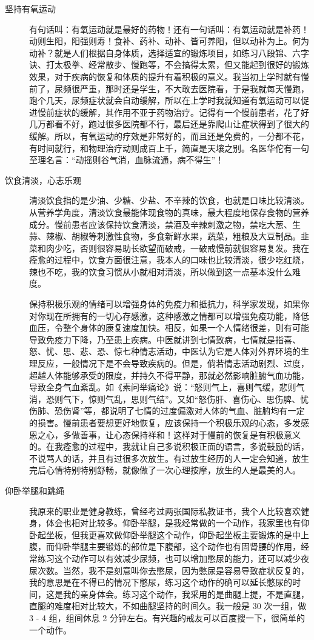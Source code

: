 \documentclass{ctexart}
\begin{document}
\begin{description}
    \item[坚持有氧运动] 有句话叫：有氧运动就是最好的药物！还有一句话叫：有氧运动就是补药！动则生阳，阳强则寿！食补、药补、动补、皆可养阳，但以动补为上。何为动补？就是人们根据自身体质，选择适宜的锻炼项目，如练习八段锦、六字诀、打太极拳、经常散步、慢跑等，不会搞得太累，但又能起到很好的锻炼效果，对于疾病的恢复和体质的提升有着积极的意义。我当初上学时就有慢前了，尿频很严重，那时还是学生，不大敢去医院看，于是我就每天慢跑，跑个几天，尿频症状就会自动缓解，所以在上学时我就知道有氧运动可以促进慢前症状的缓解，其作用不亚于药物治疗。记得有一个慢前患者，花了好几万都看不好，跑过很多医院都不行，最后还是靠爬山让症状得到了很大的缓解。所以，有氧运动的疗效是非常好的，而且还是免费的，一分都不花，有时间就行，和物理治疗动则成百上千，简直是天壤之别。名医华佗有一句至理名言：“动摇则谷气消，血脉流通，病不得生”！
    \item[饮食清淡，心志乐观] 清淡饮食指的是少油、少糖、少盐、不辛辣的饮食，也就是口味比较清淡。从营养学角度，清淡饮食最能体现食物的真味，最大程度地保存食物的营养成分。慢前患者应该保持饮食清淡，禁酒及辛辣刺激之物，禁吃大葱、生蒜、辣椒、胡椒等刺激性食物，多食新鲜水果，蔬菜，粗粮及大豆制品。韭菜和肉少吃，否则很容易助长欲望而破戒，一破戒慢前就很容易复发。我在痊愈的过程中，饮食方面很注意，我本人的口味也比较清淡，很少吃红烧，辣也不吃，我的饮食习惯从小就相对清淡，所以做到这一点基本没什么难度。

    保持积极乐观的情绪可以增强身体的免疫力和抵抗力，科学家发现，如果你对你现在所拥有的一切心存感激，这种感激之情都可以增强免疫功能，降低血压，令整个身体的康复速度加快。相反，如果一个人情绪很差，则有可能导致免疫力下降，乃至患上疾病。中医就讲到七情致病，七情就是指喜、怒、忧、思、悲、恐、惊七种情志活动，中医认为它是人体对外界环境的生理反应，一般情况下是不会导致疾病的。但是，倘若情志活动剧烈、过度，超越人体能够承受的限度，并持久不得平静，那就必然影响脏腑气血功能，导致全身气血紊乱。如《素问举痛论》说：“怒则气上，喜则气缓，悲则气消，恐则气下，惊则气乱，思则气结”。又如“怒伤肝、喜伤心、思伤脾、忧伤肺、恐伤肾”等，都说明了七情的过度偏激对人体的气血、脏腑均有一定的损害。慢前患者要想更好地恢复，应该保持一个积极乐观的心态，多发感恩之心，多做善事，让心态保持祥和！这样对于慢前的恢复是有积极意义的。在我痊愈的过程中，我就让自己多说积极正面的语言，多说鼓励的话，不说骂人的话，并且有过很多次放生。有过放生经历的人一定会知道，放生完后心情特别特别舒畅，就像做了一次心理按摩，放生的人是最美的人。
    \item[仰卧举腿和跳绳] 我原来的职业是健身教练，曾经考过两张国际私教证书，我个人比较喜欢健身，体会也相对比较多。仰卧举腿，是我经常做的一个动作，我家里也有仰卧起坐板，但我更喜欢做仰卧举腿这个动作，仰卧起坐板主要锻炼的是中上腹，而仰卧举腿主要锻炼的部位是下腹部，这个动作也有固肾腰的作用，经常练习这个动作可以有效减少尿频，也可以增加憋尿的能力，还可以减少夜尿次数。当然，我不是刻意叫你去憋尿，因为憋尿是容易导致症状反复的，我的意思是在不得已的情况下憋尿，练习这个动作的确可以延长憋尿的时间，这是我的亲身体会。练习这个动作，我采用的是曲腿上提，不是直腿，直腿的难度相对比较大，不如曲腿坚持的时间久。我一般是 30 次一组，做 3 - 4 组，组间休息 2 分钟左右。有兴趣的戒友可以百度搜一下，很简单的一个动作。


\end{description}
\end{document}
